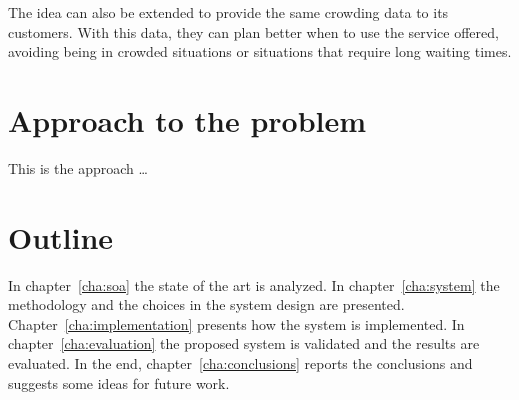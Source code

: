 The idea can also be extended to provide the same crowding data to its customers. With this data, they can plan better when to use the service offered, avoiding being in crowded situations or situations that require long waiting times.


\section{Approach to the problem} 
\label{sec:approach}
\vspace{0.2 cm} 

This is the approach \dots


\section{Outline} 
\label{sec:outline}
\vspace{0.2 cm} 

In chapter~\ref{cha:soa} the state of the art is analyzed.
In chapter~\ref{cha:system} the methodology and the choices in the system design are presented.
Chapter~\ref{cha:implementation}  presents how the system is implemented.
In chapter~\ref{cha:evaluation} the proposed system is validated and the results are evaluated.
In the end, chapter~\ref{cha:conclusions} reports the conclusions and suggests some ideas for future work.

